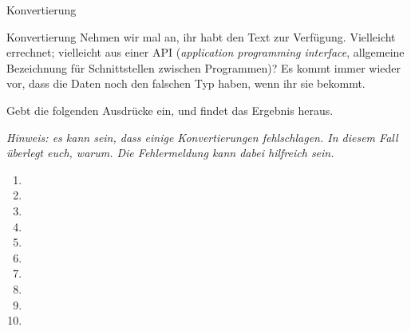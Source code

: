 \begin{task}[points=auto]{Konvertierung }
    \begin{subtask*}[points=0]{Konvertierung}
        Nehmen wir mal an, ihr habt den Text  zur Verfügung. Vielleicht
        errechnet; vielleicht aus einer API (\textit{application programming interface}, allgemeine Bezeichnung für Schnittstellen zwischen Programmen)? Es kommt immer wieder vor, dass die Daten noch den falschen Typ haben, wenn ihr sie bekommt.

        Gebt die folgenden Ausdrücke ein, und findet das Ergebnis heraus.

        \textit{Hinweis: es kann sein, dass einige Konvertierungen fehlschlagen. In diesem Fall überlegt euch, warum. Die Fehlermeldung kann dabei hilfreich sein.}

        \begin{multicols}{3}
            \begin{enumerate}
                \item {}
                \item {}
                \item {}
                \item {}
                \item {}
                \item {}
                \item {}
                \item {}
                \item {}
                \item {}
            \end{enumerate}
        \end{multicols}


\end{subtask*}
\end{task}
